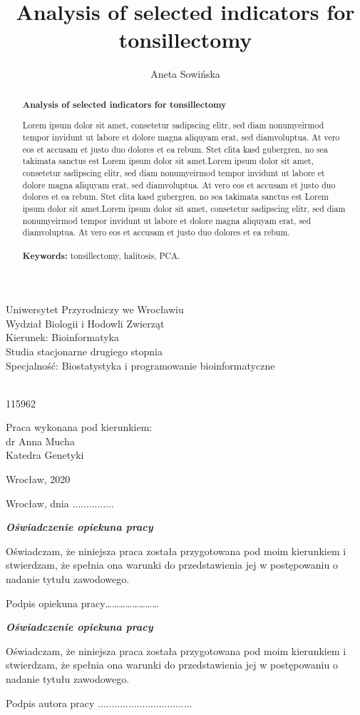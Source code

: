 \documentclass[12pt,a4paper,notitlepage]{report}
\author{Aneta Sowi\'nska}
\title{Analysis of selected indicators for tonsillectomy}
\makeatletter
\renewcommand{\maketitle}{\begin{titlepage}

    \begin{center}
    \LARGE Uniwersytet Przyrodniczy we Wroc\l{}awiu\\
    \Large Wydzia\l{} Biologii i Hodowli Zwierz\k{a}t\\
    \large Kierunek: Bioinformatyka\\
    Studia stacjonarne drugiego stopnia\\
    Specjalno\'s\'c: Biostatystyka i programowanie bioinformatyczne
    \end{center}

    \vspace{3cm}

    \begin{center}
    \huge \@author \\
    \large 115962
    
    \vspace{2cm}
    
     \textbf{\Huge \@title}
     \end{center}

    \vspace{5cm}
    
    \begin{flushright}
     {\large Praca wykonana pod kierunkiem:}\\
         dr Anna Mucha\\
         Katedra Genetyki
     \end{flushright}

    \vspace*{\stretch{6}}

    \begin{center}
    \Large Wroc\l{}aw, 2020
    \end{center}

  \end{titlepage}%
}
\makeatother
\begin{document}

\maketitle



\noindent Wroc\l{}aw, dnia ...............
\vspace{3cm}

\begin{flushleft}
\textbf{\textit{\large Oświadczenie opiekuna pracy}}
\end{flushleft}
Oświadczam, że niniejsza praca została przygotowana pod moim kierunkiem i stwierdzam, że spełnia ona warunki do przedstawienia jej w postępowaniu o nadanie tytułu zawodowego.
\vspace{2cm}
\begin{flushright}
Podpis opiekuna pracy……………………
\end{flushright}

\vspace{2cm}
\begin{flushleft}
\textbf{\textit{\large Oświadczenie opiekuna pracy}}
\end{flushleft}
Oświadczam, że niniejsza praca została przygotowana pod moim kierunkiem i stwierdzam, że spełnia ona warunki do przedstawienia jej w postępowaniu o nadanie tytułu zawodowego.
\vspace{2cm}
\begin{flushright}
Podpis autora pracy ..................................
\end{flushright}


\clearpage
\linespread{1.3}
\begin{abstract}
\vspace{0.5cm}
\begin{center}
\textbf{Analysis of selected indicators for tonsillectomy}
\end{center}
\vspace{0.5cm}
Lorem ipsum dolor sit amet, consetetur sadipscing elitr, sed diam nonumyeirmod tempor invidunt ut labore et dolore magna aliquyam erat, sed diamvoluptua. At vero eos et accusam et justo duo dolores et ea rebum. Stet clita kasd gubergren, no sea takimata sanctus est Lorem ipsum dolor sit amet.Lorem ipsum dolor sit amet, consetetur sadipscing elitr, sed diam nonumyeirmod tempor invidunt ut labore et dolore magna aliquyam erat, sed diamvoluptua. At vero eos et accusam et justo duo dolores et ea rebum. Stet clita kasd gubergren, no sea takimata sanctus est Lorem ipsum dolor sit amet.Lorem ipsum dolor sit amet, consetetur sadipscing elitr, sed diam nonumyeirmod tempor invidunt ut labore et dolore magna aliquyam erat, sed diamvoluptua. At vero eos et accusam et justo duo dolores et ea rebum. \\ \\
\textbf{Keywords:} tonsillectomy, halitosis, PCA.

\end{abstract}
\end{document}
